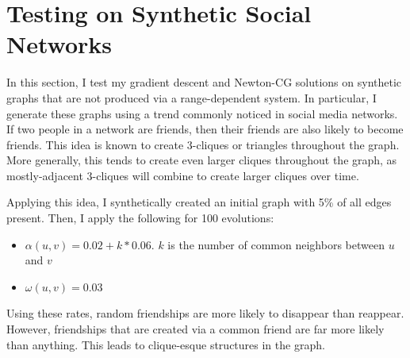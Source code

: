 
\section{Testing on Synthetic Social Networks}

In this section, I test my gradient descent and Newton-CG solutions on synthetic graphs that are not produced
via a range-dependent system.
In particular, I generate these graphs using a trend commonly noticed in social media networks.
If two people in a network are friends, then their friends are also likely to become friends.
This idea is known to create 3-cliques or triangles throughout the graph.
More generally, this tends to create even larger cliques throughout the graph, as mostly-adjacent 3-cliques will
combine to create larger cliques over time.

Applying this idea, I synthetically created an initial graph with 5\% of all edges present.
Then, I apply the following for 100 evolutions:
\begin{itemize}
    \item $\alpha (u, v) = 0.02 + k*0.06$. $k$ is the number of common neighbors between $u$ and $v$
    \item $\omega (u, v) = 0.03$
\end{itemize}

Using these rates, random friendships are more likely to disappear than reappear.
However, friendships that are created via a common friend are far more likely than anything.
This leads to clique-esque structures in the graph.

